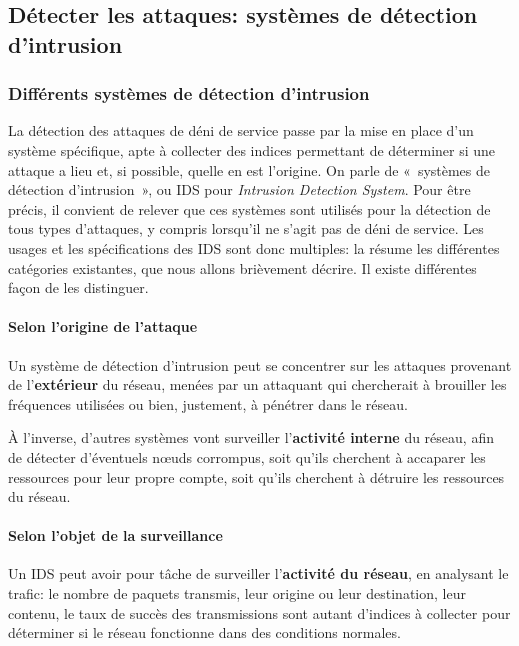 \subsection{Détecter les attaques: systèmes de détection d'intrusion}

    \subsubsection{Différents systèmes de détection d'intrusion}
La détection des attaques de déni de service passe par la mise en place d'un système spécifique, apte à collecter des indices permettant de déterminer si une attaque a lieu et, si possible, quelle en est l'origine.
On parle de « systèmes de détection d'intrusion », ou IDS pour \textit{Intrusion Detection System}.
Pour être précis, il convient de relever que ces systèmes sont utilisés pour la détection de tous types d'attaques, y compris lorsqu'il ne s'agit pas de déni de service.
Les usages et les spécifications des IDS sont donc multiples: la  résume les différentes catégories existantes, que nous allons brièvement décrire.
Il existe différentes façon de les distinguer.


        \paragraph{Selon l'origine de l'attaque}
Un système de détection d'intrusion peut se concentrer sur les attaques provenant de l'\textbf{extérieur} du réseau, menées par un attaquant qui chercherait à brouiller les fréquences utilisées ou bien, justement, à pénétrer dans le réseau.

À l'inverse, d'autres systèmes vont surveiller l'\textbf{activité interne} du réseau, afin de détecter d'éventuels nœuds corrompus, soit qu'ils cherchent à accaparer les ressources pour leur propre compte, soit qu'ils cherchent à détruire les ressources du réseau.

        \paragraph{Selon l'objet de la surveillance}\label{ea:sss:hids}
Un IDS peut avoir pour tâche de surveiller l'\textbf{activité du réseau}, en analysant le trafic: le nombre de paquets transmis, leur origine ou leur destination, leur contenu, le taux de succès des transmissions sont autant d'indices à collecter pour déterminer si le réseau fonctionne dans des conditions normales.

